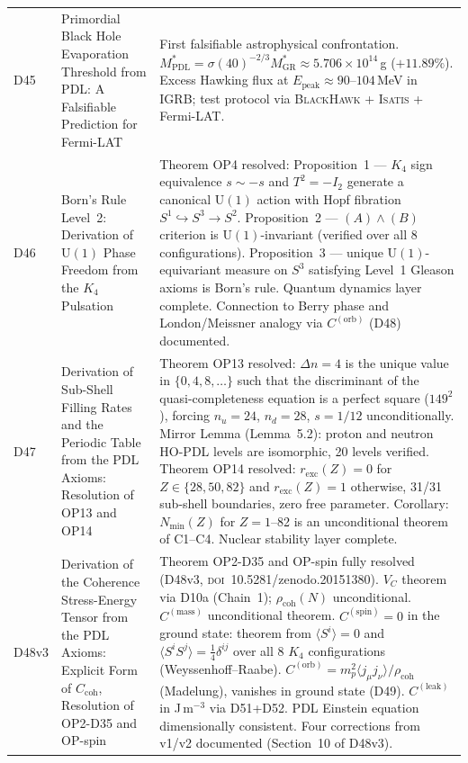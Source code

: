 \documentclass[11pt,a4paper]{article}
\theoremstyle{plain}
\theoremstyle{definition}
\theoremstyle{remark}
\newcommand{\rhocoh}{\rho_{\mathrm{coh}}}
\newcommand{\Ccoh}{C_{\mathrm{coh}}}
\begin{document}
\begin{longtable}{L{1.3cm}L{3.8cm}L{8.0cm}}
D45 & Primordial Black Hole Evaporation Threshold from PDL: A Falsifiable Prediction for Fermi-LAT~\cite{D45} & First falsifiable astrophysical confrontation. $M^*_{\mathrm{PDL}} = \sigma(40)^{-2/3} M^*_{\mathrm{GR}} \approx 5.706 \times 10^{14}$\,g ($+11.89\%$). Excess Hawking flux at $E_{\mathrm{peak}} \approx 90$--$104$\,MeV in IGRB; test protocol via \textsc{BlackHawk} + \textsc{Isatis} + Fermi-LAT.\\[0.4em]
D46 & Born's Rule Level~2: Derivation of $\mathrm{U}(1)$ Phase Freedom from the $K_4$ Pulsation~\cite{D46} & \textcolor{proofblue}{Theorem} OP4 resolved: Proposition~1 — $K_4$ sign equivalence $s \sim -s$ and $T^2=-I_2$ generate a canonical $\mathrm{U}(1)$ action with Hopf fibration $S^1\hookrightarrow S^3\to S^2$. Proposition~2 — $(A)\wedge(B)$ criterion is $\mathrm{U}(1)$-invariant (verified over all 8 configurations). Proposition~3 — unique $\mathrm{U}(1)$-equivariant measure on $S^3$ satisfying Level~1 Gleason axioms is Born's rule. Quantum dynamics layer complete. Connection to Berry phase and London/Meissner analogy via $C^{(\mathrm{orb})}$ (D48) documented.\\[0.4em]
D47 & Derivation of Sub-Shell Filling Rates and the Periodic Table from the PDL Axioms: Resolution of OP13 and OP14~\cite{D47} & \textcolor{proofblue}{Theorem} OP13 resolved: $\Delta n=4$ is the unique value in $\{0,4,8,\ldots\}$ such that the discriminant of the quasi-completeness equation is a perfect square ($149^2$), forcing $n_u=24$, $n_d=28$, $s=1/12$ unconditionally. Mirror Lemma (Lemma~5.2): proton and neutron HO-PDL levels are isomorphic, 20 levels verified. \textcolor{proofblue}{Theorem} OP14 resolved: $r_{\mathrm{exc}}(Z)=0$ for $Z\in\{28,50,82\}$ and $r_{\mathrm{exc}}(Z)=1$ otherwise, 31/31 sub-shell boundaries, zero free parameter. Corollary: $N_{\min}(Z)$ for $Z=1$--82 is an unconditional theorem of C1--C4. Nuclear stability layer complete.\\[0.4em]
D48v3 & Derivation of the Coherence Stress-Energy Tensor from the PDL Axioms: Explicit Form of $\Ccoh$, Resolution of OP2-D35 and OP-spin~\cite{D48} & \textcolor{proofblue}{Theorem} OP2-D35 and OP-spin fully resolved (D48v3, \textsc{doi}~10.5281/zenodo.20151380). $V_C$ theorem via D10a (Chain~1); $\rhocoh(N)$ unconditional. $C^{(\mathrm{mass})}$ unconditional theorem. $C^{(\mathrm{spin})}=0$ in the ground state: theorem from $\langle S^i\rangle=0$ and $\langle S^iS^j\rangle=\tfrac{1}{4}\delta^{ij}$ over all 8 $K_4$ configurations (Weyssenhoff--Raabe). $C^{(\mathrm{orb})}=m_p^2\langle j_\mu j_\nu\rangle/\rhocoh$ (Madelung), vanishes in ground state (D49). $C^{(\mathrm{leak})}$ in J\,m$^{-3}$ via D51+D52. PDL Einstein equation dimensionally consistent. Four corrections from v1/v2 documented (Section~10 of D48v3).\\[0.4em]

\end{longtable}
\end{document}
